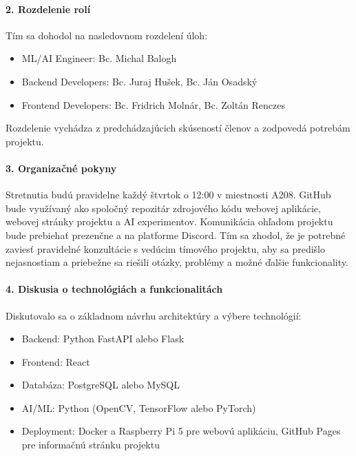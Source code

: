 \paragraph{2. Rozdelenie rolí} 
Tím sa dohodol na nasledovnom rozdelení úloh:
\begin{itemize}
    \item ML/AI Engineer: Bc. Michal Balogh
    \item Backend Developers: Bc. Juraj Hušek, Bc. Ján Osadský
    \item Frontend Developers: Bc. Fridrich Molnár, Bc. Zoltán Renczes
\end{itemize}
Rozdelenie vychádza z predchádzajúcich skúseností členov a zodpovedá potrebám projektu.

\paragraph{3. Organizačné pokyny} 
Stretnutia budú pravidelne každý štvrtok o 12:00 v miestnosti A208. GitHub bude využívaný ako spoločný repozitár zdrojového kódu webovej aplikácie, webovej stránky projektu a AI experimentov. Komunikácia ohľadom projektu bude prebiehať prezenčne a na platforme Discord. Tím sa zhodol, že je potrebné zaviesť pravidelné konzultácie s vedúcim tímového projektu, aby sa predišlo nejasnostiam a priebežne sa riešili otázky, problémy a možné ďalšie funkcionality.

\paragraph{4. Diskusia o technológiách a funkcionalitách} 
Diskutovalo sa o základnom návrhu architektúry a výbere technológií:
\begin{itemize}
    \item Backend: Python FastAPI alebo Flask
    \item Frontend: React
    \item Databáza: PostgreSQL alebo MySQL
    \item AI/ML: Python (OpenCV, TensorFlow alebo PyTorch)
    \item Deployment: Docker a Raspberry Pi 5 pre webovú aplikáciu, GitHub Pages pre informačnú stránku projektu
\end{itemize}

